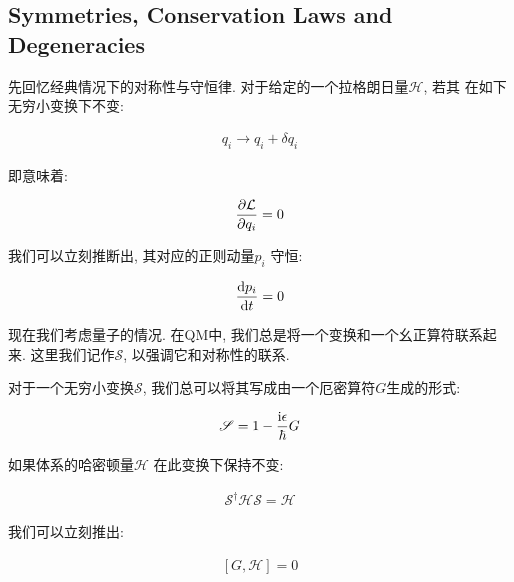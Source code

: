 \subsection{Symmetries, Conservation Laws and Degeneracies}

先回忆经典情况下的对称性与守恒律. 对于给定的一个拉格朗日量$\mathcal{H}$, 若其
在如下无穷小变换下不变:

\begin{equation}
  \begin{aligned}
    q_{i} \to q_{i} + \delta q_{i}
  \end{aligned}
\end{equation}

即意味着:

\begin{equation}
  \begin{aligned}
    \pdv{\mathcal{L}}{q_{i}} = 0
  \end{aligned}
\end{equation}

我们可以立刻推断出, 其对应的正则动量$p_{i}$ 守恒:

\begin{equation}
  \begin{aligned}
    \dv{p_{i}}{t} = 0
  \end{aligned}
\end{equation}

现在我们考虑量子的情况. 在QM中, 我们总是将一个变换和一个幺正算符联系起来.
这里我们记作$\mathscr{S}$, 以强调它和对称性的联系.

对于一个无穷小变换$\mathscr{S}$, 我们总可以将其写成由一个厄密算符$G$生成的形式:

\begin{equation}
  \begin{aligned}
    \mathscr{S} = 1 - \frac{{\rm i} \epsilon}{\hbar} G
  \end{aligned}
\end{equation}

如果体系的哈密顿量$\mathcal{H}$ 在此变换下保持不变:

\begin{equation} \label{eq:symmetry_condition_for_hamiltonian}
  \begin{aligned}
    \mathscr{S}^{\dagger} \mathcal{H} \mathscr{S} = \mathcal{H}
  \end{aligned}
\end{equation}

我们可以立刻推出:

\begin{equation}
  \begin{aligned}
    [G,\mathcal{H}] = 0
  \end{aligned}
\end{equation}

